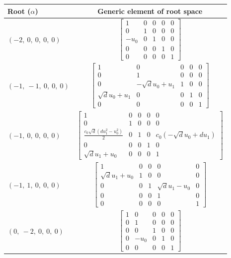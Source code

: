 \documentclass[11pt]{article}
\theoremstyle{definition}
\begin{document}
\noindent \begin{tabular}{|l|c|}
    \hline
    \textbf{Root ($\alpha$)} & \textbf{Generic element of root space} \\
    \hline
    $\left( -2, \  0, \  0, \  0, \  0\right)$ & $\left[\begin{matrix}1 & 0 & 0 & 0 & 0\\0 & 1 & 0 & 0 & 0\\- u_{0} & 0 & 1 & 0 & 0\\0 & 0 & 0 & 1 & 0\\0 & 0 & 0 & 0 & 1\end{matrix}\right]$ \\
    \hline
    $\left( -1, \  -1, \  0, \  0, \  0\right)$ & $\left[\begin{matrix}1 & 0 & 0 & 0 & 0\\0 & 1 & 0 & 0 & 0\\0 & - \sqrt{d} u_{0} + u_{1} & 1 & 0 & 0\\\sqrt{d} u_{0} + u_{1} & 0 & 0 & 1 & 0\\0 & 0 & 0 & 0 & 1\end{matrix}\right]$ \\
    \hline
    $\left( -1, \  0, \  0, \  0, \  0\right)$ & $\left[\begin{matrix}1 & 0 & 0 & 0 & 0\\0 & 1 & 0 & 0 & 0\\\frac{c_{0} \sqrt{d} \left(d u_{1}^{2} - u_{0}^{2}\right)}{2} & 0 & 1 & 0 & c_{0} \left(- \sqrt{d} u_{0} + d u_{1}\right)\\0 & 0 & 0 & 1 & 0\\\sqrt{d} u_{1} + u_{0} & 0 & 0 & 0 & 1\end{matrix}\right]$ \\
    \hline
    $\left( -1, \  1, \  0, \  0, \  0\right)$ & $\left[\begin{matrix}1 & 0 & 0 & 0 & 0\\\sqrt{d} u_{1} + u_{0} & 1 & 0 & 0 & 0\\0 & 0 & 1 & \sqrt{d} u_{1} - u_{0} & 0\\0 & 0 & 0 & 1 & 0\\0 & 0 & 0 & 0 & 1\end{matrix}\right]$ \\
    \hline
    $\left( 0, \  -2, \  0, \  0, \  0\right)$ & $\left[\begin{matrix}1 & 0 & 0 & 0 & 0\\0 & 1 & 0 & 0 & 0\\0 & 0 & 1 & 0 & 0\\0 & - u_{0} & 0 & 1 & 0\\0 & 0 & 0 & 0 & 1\end{matrix}\right]$ \\

\end{tabular}
\end{document}
